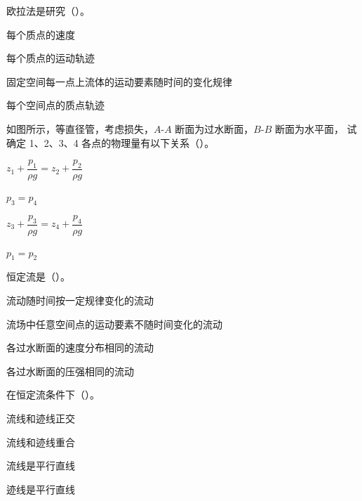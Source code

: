 \begin{ti}

\item[3-1] 欧拉法是研究（\quad）。
\begin{choices}
\item 每个质点的速度
\item 每个质点的运动轨迹
\item 固定空间每一点上流体的运动要素随时间的变化规律
\item 每个空间点的质点轨迹
\end{choices}

\item[3-2] 如图所示，等直径管，考虑损失，$A$-$A$ 断面为过水断面，$B$-$B$ 断面为水平面，
试确定 1、2、3、4 各点的物理量有以下关系（\quad）。
\begin{choices}
\item $z_1+\dfrac{p_1}{\rho g}=z_2+\dfrac{p_2}{\rho g}$
\item $p_3=p_4$
\item $z_3+\dfrac{p_3}{\rho g}=z_4+\dfrac{p_4}{\rho g}$
\item $p_1=p_2$
\end{choices}

\item[3-3] 恒定流是（\quad）。
\begin{choices}
\item 流动随时间按一定规律变化的流动
\item 流场中任意空间点的运动要素不随时间变化的流动
\item 各过水断面的速度分布相同的流动
\item 各过水断面的压强相同的流动
\end{choices}

\item[3-4] 在恒定流条件下（\quad）。
\begin{choices}
\item 流线和迹线正交
\item 流线和迹线重合
\item 流线是平行直线
\item 迹线是平行直线
\end{choices}


\end{ti}
